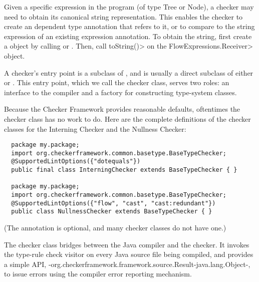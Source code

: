 Given a specific expression in the program (of type Tree or Node), a
checker may need to obtain its canonical string representation.  This
enables the checker to create an dependent type annotation that refers to
it, or to compare to the string expression of an existing expression
annotation.
To obtain the string, first create a
 object by calling
 or
.
Then, call \<toString()> on the \<FlowExpressions.Receiver> object.



A checker's entry point is a subclass of
, and is usually a direct subclass
of either  or
.
This entry
point, which we call the checker class, serves two
roles:  an interface to the compiler and a factory for constructing
type-system classes.

Because the Checker Framework provides reasonable defaults, oftentimes the
checker class has no work to do.  Here are the complete definitions of the
checker classes for the Interning Checker and the Nullness Checker:

\begin{Verbatim}
  package my.package;
  import org.checkerframework.common.basetype.BaseTypeChecker;
  @SupportedLintOptions({"dotequals"})
  public final class InterningChecker extends BaseTypeChecker { }

  package my.package;
  import org.checkerframework.common.basetype.BaseTypeChecker;
  @SupportedLintOptions({"flow", "cast", "cast:redundant"})
  public class NullnessChecker extends BaseTypeChecker { }
\end{Verbatim}

(The  annotation is
optional, and many checker classes do not have one.)

The checker class bridges between the Java compiler and the checker.  It
invokes the type-rule check visitor on every Java source file being
compiled, and provides a simple API,
{-org.checkerframework.framework.source.Result-java.lang.Object-}, to issue
errors using the compiler error reporting mechanism.


